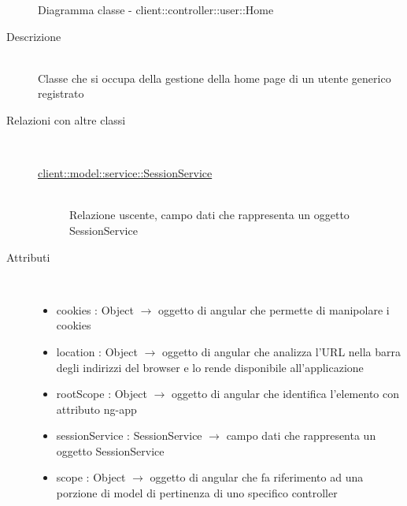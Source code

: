 \vspace{0.5cm}
\hypertarget{client::controller::user::Home}{}
\begin{figure}[H]
	\centering
	\caption{Diagramma classe - client::controller::user::Home}
\end{figure}\begin{description}
\item[Descrizione] \hfill \\
Classe che si occupa della gestione della home page di un utente generico registrato
\item[Relazioni con altre classi] \hfill \\
\vspace{-7mm}
\begin{description}
	\item[\hyperlink{client::model::service::SessionService}{client::model::service::SessionService}] \hfill \\
	Relazione uscente, campo dati che rappresenta un oggetto SessionService
\end{description}

\item[Attributi] \hfill \\
\vspace{-7mm}
\begin{itemize}
	\item cookies : Object $\rightarrow$ oggetto di angular che permette di manipolare i cookies
	\item location : Object $\rightarrow$ oggetto di angular che analizza l'URL nella barra degli indirizzi del browser e lo rende disponibile all'applicazione
	\item rootScope : Object $\rightarrow$ oggetto di angular che identifica l’elemento con attributo ng-app
	\item sessionService : SessionService $\rightarrow$ campo dati che rappresenta un oggetto SessionService
	\item scope : Object $\rightarrow$ oggetto di angular che fa riferimento ad una porzione di model di pertinenza di uno specifico controller
\end{itemize}


\end{description}
